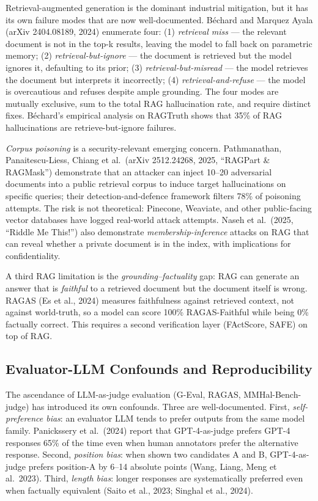 Retrieval-augmented generation is the dominant industrial mitigation, but it has its own failure modes that are now well-documented. Béchard and Marquez Ayala (arXiv 2404.08189, 2024) enumerate four: (1) \emph{retrieval miss} --- the relevant document is not in the top-k results, leaving the model to fall back on parametric memory; (2) \emph{retrieval-but-ignore} --- the document is retrieved but the model ignores it, defaulting to its prior; (3) \emph{retrieval-but-misread} --- the model retrieves the document but interprets it incorrectly; (4) \emph{retrieval-and-refuse} --- the model is overcautious and refuses despite ample grounding. The four modes are mutually exclusive, sum to the total RAG hallucination rate, and require distinct fixes. Béchard's empirical analysis on RAGTruth shows that 35\% of RAG hallucinations are retrieve-but-ignore failures.

\emph{Corpus poisoning} is a security-relevant emerging concern. Pathmanathan, Panaitescu-Liess, Chiang et al.~(arXiv 2512.24268, 2025, ``RAGPart \& RAGMask'') demonstrate that an attacker can inject 10--20 adversarial documents into a public retrieval corpus to induce target hallucinations on specific queries; their detection-and-defence framework filters 78\% of poisoning attempts. The risk is not theoretical: Pinecone, Weaviate, and other public-facing vector databases have logged real-world attack attempts. Naseh et al.~(2025, ``Riddle Me This!'') also demonstrate \emph{membership-inference} attacks on RAG that can reveal whether a private document is in the index, with implications for confidentiality.

A third RAG limitation is the \emph{grounding--factuality} gap: RAG can generate an answer that is \emph{faithful} to a retrieved document but the document itself is wrong. RAGAS (Es et al., 2024) measures faithfulness against retrieved context, not against world-truth, so a model can score 100\% RAGAS-Faithful while being 0\% factually correct. This requires a second verification layer (FActScore, SAFE) on top of RAG.

\subsection{Evaluator-LLM Confounds and Reproducibility}\label{evaluator-llm-confounds-and-reproducibility}

The ascendance of LLM-as-judge evaluation (G-Eval, RAGAS, MMHal-Bench-judge) has introduced its own confounds. Three are well-documented. First, \emph{self-preference bias}: an evaluator LLM tends to prefer outputs from the same model family. Panickssery et al.~(2024) report that GPT-4-as-judge prefers GPT-4 responses 65\% of the time even when human annotators prefer the alternative response. Second, \emph{position bias}: when shown two candidates A and B, GPT-4-as-judge prefers position-A by 6--14 absolute points (Wang, Liang, Meng et al.~2023). Third, \emph{length bias}: longer responses are systematically preferred even when factually equivalent (Saito et al., 2023; Singhal et al., 2024).

